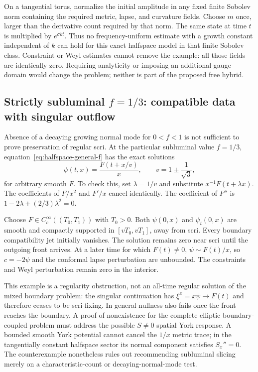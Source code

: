 On a tangential torus, normalize the initial amplitude in any fixed finite
Sobolev norm containing the required metric, lapse, and curvature fields.
Choose $m$ once, larger than the derivative count required by that norm.
The same state at time $t$ is multiplied by $e^{\sigma kt}$.  Thus no
frequency-uniform estimate with a growth constant independent of $k$ can hold
for this exact halfspace model in that finite Sobolev class.  Constraint or
Weyl estimates cannot remove the example: all those fields are identically
zero.  Requiring analyticity or imposing an additional gauge domain would
change the problem; neither is part of the proposed free hybrid.

\subsection{Strictly subluminal $f=1/3$: compatible data with singular outflow}

Absence of a decaying growing normal mode for $0<f<1$ is not sufficient to
prove preservation of regular scri.  At the particular subluminal value
$f=1/3$, equation~\eqref{eq:halfspace-general-f} has the exact solutions
\begin{equation}
 \psi(t,x)=\frac{F(t+x/v)}{x},\qquad
 v=1\pm\frac1{\sqrt3},
 \label{eq:subluminal-singular-outflow}
\end{equation}
for arbitrary smooth $F$.  To check this, set
$\lambda=1/v$ and substitute $x^{-1}F(t+\lambda x)$.
The coefficients of $F/x^2$ and $F'/x$ cancel identically.  The coefficient
of $F''$ is $1-2\lambda+(2/3)\lambda^2=0$.

Choose $F\in C^\infty_c((T_0,T_1))$ with $T_0>0$.
Both $\psi(0,x)$ and $\psi_t(0,x)$ are smooth and compactly supported in
$[vT_0,vT_1]$, away from scri.  Every boundary compatibility jet initially
vanishes.  The solution remains zero near scri until the outgoing front
arrives.  At a later time for which $F(t)\ne0$,
$\psi\sim F(t)/x$, so $c=-2\psi$ and the conformal lapse perturbation
are unbounded.  The constraints and Weyl perturbation remain zero in the
interior.

This example is a regularity obstruction, not an all-time regular solution of
the mixed boundary problem: the singular continuation has
$\xi^x=x\psi\to F(t)$ and therefore ceases to be scri-fixing.
In general nullness also fails once the front reaches the boundary.
A proof of nonexistence for the complete elliptic boundary-coupled problem
must address the possible $S\ne0$ spatial York response.  A bounded smooth
York potential cannot cancel the $1/x$ metric trace; in the tangentially
constant halfspace sector its normal component satisfies $S_x''=0$.
The counterexample nonetheless rules out recommending subluminal slicing
merely on a characteristic-count or decaying-normal-mode test.

